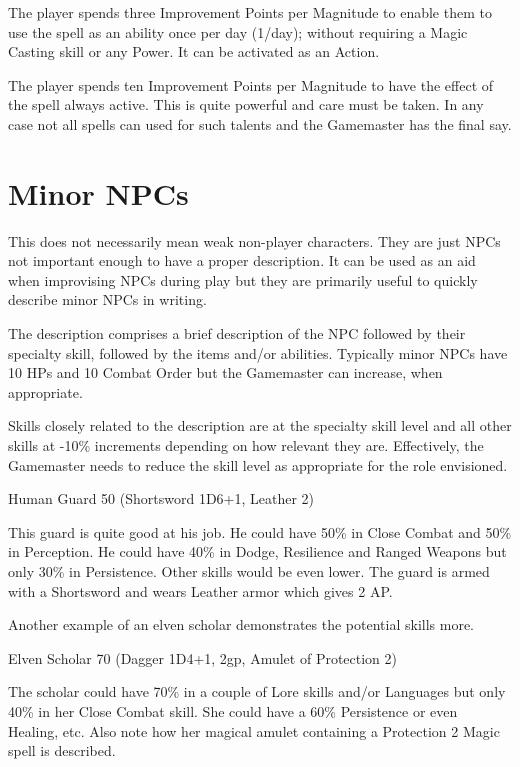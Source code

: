 The player spends three Improvement Points per Magnitude to enable them to use the spell as an ability once per day (1/day); without requiring a Magic Casting skill or any Power. It can be activated as an Action. 

The player spends ten Improvement Points per Magnitude to have the effect of the spell always active. This is quite powerful and care must be taken. In any case not all spells can used for such talents and the Gamemaster has the final say.


\section{Minor NPCs}
This does not necessarily mean weak non-player characters. They are just NPCs not important enough to have a proper description. It can be used as an aid when improvising NPCs during play but they are primarily useful to quickly describe minor NPCs in writing.

The description comprises a brief description of the NPC followed by their specialty skill, followed by the items and/or abilities. Typically minor NPCs have 10 HPs and 10 Combat Order but the Gamemaster can increase, when appropriate.

Skills closely related to the description are at the specialty skill level and all other skills at -10\% increments depending on how relevant they are. Effectively, the Gamemaster needs to reduce the skill level as appropriate for the role envisioned.


\begin{rpg-examplebox}	
Human Guard 50 (Shortsword 1D6+1, Leather 2)
\end{rpg-examplebox}

This guard is quite good at his job. He could have 50\% in Close Combat and 50\% in Perception. He could have 40\% in Dodge, Resilience and Ranged Weapons but only 30\% in Persistence. Other skills would be even lower.
The guard is armed with a Shortsword and wears Leather armor which gives 2 AP.

Another example of an elven scholar demonstrates the potential skills more.

\begin{rpg-examplebox}
Elven Scholar 70 (Dagger 1D4+1, 2gp, Amulet of Protection 2)
\end{rpg-examplebox}

The scholar could have 70\% in a couple of Lore skills and/or Languages but only 40\% in her Close Combat skill. She could have a 60\% Persistence or even Healing, etc.
Also note how her magical amulet containing a Protection 2 Magic spell is described.

